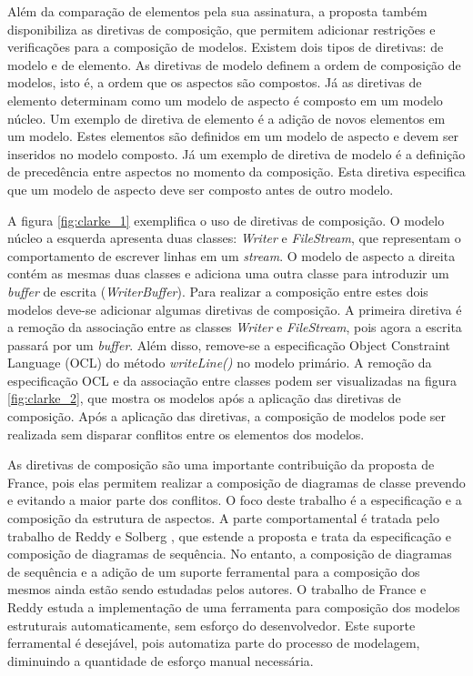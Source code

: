 Além da comparação de elementos pela sua assinatura, a proposta também disponibiliza as diretivas de composição, que permitem adicionar restrições e
verificações para a composição de modelos. Existem dois tipos de diretivas: de modelo e de elemento. As diretivas de modelo definem a ordem de
composição de modelos, isto é, a ordem que os aspectos são compostos. Já as diretivas de elemento determinam como um modelo de aspecto é composto em
um modelo núcleo. Um exemplo de diretiva de elemento é a adição de novos elementos em um modelo. Estes elementos são definidos em um modelo de aspecto
e devem ser inseridos no modelo composto. Já um exemplo de diretiva de modelo é a definição de precedência entre aspectos no momento da composição.
Esta diretiva especifica que um modelo de aspecto deve ser composto antes de outro modelo.

A figura \ref{fig:clarke_1} exemplifica o uso de diretivas de composição. O modelo núcleo a esquerda apresenta duas classes: \textit{Writer} e
\textit{FileStream}, que representam o comportamento de escrever linhas em um \textit{stream}. O modelo de aspecto a direita contém as mesmas duas
classes e adiciona uma outra classe para introduzir um \textit{buffer} de escrita (\textit{WriterBuffer}). Para realizar a composição entre estes dois
modelos deve-se adicionar algumas diretivas de composição. A primeira diretiva é a remoção da associação entre as classes \textit{Writer} e
\textit{FileStream}, pois agora a escrita passará por um \textit{buffer}. Além disso, remove-se a especificação Object Constraint Language (OCL)
\cite{ocl:12} do método \textit{writeLine()} no modelo primário. A remoção da especificação OCL e da associação entre classes podem ser visualizadas
na figura \ref{fig:clarke_2}, que mostra os modelos após a aplicação das diretivas de composição. Após a aplicação das diretivas, a composição de modelos pode ser realizada sem disparar conflitos entre
os elementos dos modelos.

As diretivas de composição são uma importante contribuição da proposta de France, pois elas permitem realizar a composição de diagramas de classe
prevendo e evitando a maior parte dos conflitos. O foco deste trabalho é a especificação e a composição da estrutura de aspectos. A parte
comportamental é tratada pelo trabalho de Reddy e Solberg \cite{ReddySolberg}, que estende a proposta e trata da especificação e composição 
de diagramas de sequência. No entanto, a composição de diagramas de sequência e a adição de um suporte ferramental para a composição dos mesmos ainda estão
sendo estudadas pelos autores. O trabalho de France e Reddy \cite{FranceReddy} estuda a implementação de uma ferramenta para composição dos modelos
estruturais automaticamente, sem esforço do desenvolvedor. Este suporte ferramental é desejável, pois automatiza parte do processo de modelagem,
diminuindo a quantidade de esforço manual necessária.

